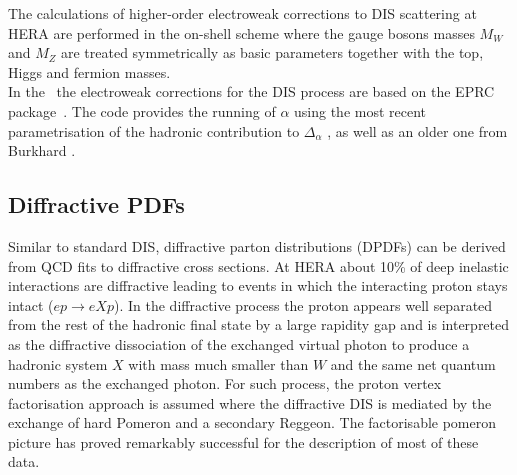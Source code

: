 The calculations of higher-order electroweak corrections to DIS scattering at 
HERA are performed in the on-shell scheme where the gauge bosons masses $M_W$ and 
$M_Z$ are treated symmetrically as basic parameters together with the top, Higgs 
and fermion masses.
\\
In the \fitter\, the electroweak corrections 
for the DIS process are based on the EPRC package~\cite{SpiesbergerPrivComm}.
The code provides the running of $\alpha$ using the most recent parametrisation
of the hadronic contribution to $\Delta_\alpha$ \cite{Jegerlehner}, as well as 
an older one from Burkhard \cite{Burkhard}.


\subsection{Diffractive PDFs}

\newcommand{\asotp}{\ensuremath{\frac{\alpha_{\rm s}}{2\pi}}}
\newcommand{\Sgl}[1]{\ensuremath{\tilde f_{#1+}}}
\newcommand{\Pom}{{I\!P}}
\newcommand{\Reg}{{I\!R}}
\newcommand{\xpom}{$x_{I\!P}$}


Similar to standard DIS, diffractive parton distributions (DPDFs) 
can be derived from QCD fits to diffractive cross sections.
At HERA about 10\% of deep inelastic interactions are diffractive leading to
events in which the interacting proton stays intact ($ep\to eXp$). 
In the diffractive process the proton appears well separated from the 
rest of the hadronic final state by a large rapidity gap  
and is interpreted as the diffractive dissociation 
of the exchanged virtual photon to produce a hadronic system $X$ with mass much 
smaller than $W$ and the same net quantum numbers as the exchanged photon.
For such process, the proton vertex factorisation approach
is assumed where the diffractive DIS is mediated by the exchange of hard Pomeron and a
secondary Reggeon. 
The factorisable pomeron picture has proved remarkably successful for the description of most of these data.
%

